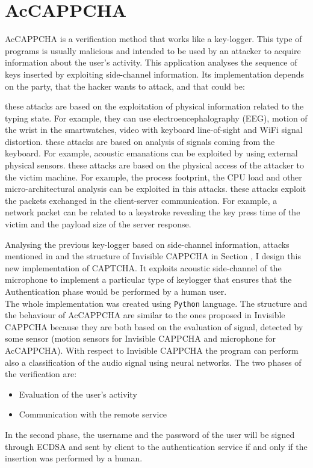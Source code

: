 \chapter{AcCAPPCHA}\label{chapter:AcCAPPCHA}
AcCAPPCHA is a verification method that works like a key-logger. This type of programs is usually malicious and intended to be used by an attacker to acquire information about the user's activity. This application analyses the sequence of keys inserted by exploiting side-channel information. Its implementation depends on the party, that the hacker wants to attack\cite{keylogging}, and that could be:
\begin{itemize}
{these attacks are based on the exploitation of physical information related to the typing state. For example, they can use electroencephalography (EEG), motion of the wrist in the smartwatches, video with keyboard line-of-sight and WiFi signal distortion.}
{these attacks are based on analysis of signals coming from the keyboard. For example, acoustic emanations can be exploited by using external physical sensors.}
{these attacks are based on the physical access of the attacker to the victim machine. For example, the process footprint, the CPU load and other micro-architectural analysis can be exploited in this attacks.}
{these attacks exploit the packets exchanged in the client-server communication. For example, a network packet can be related to a keystroke revealing the key press time of the victim and the payload size of the server response.}
\end{itemize}
Analysing the previous key-logger based on side-channel information, attacks mentioned in  and the structure of Invisible CAPPCHA in Section , I design this new implementation of CAPTCHA. It exploits acoustic side-channel of the microphone to implement a particular type of keylogger that ensures that the Authentication phase would be performed by a human user.\\
The whole implementation was created using \texttt{Python} language. The structure and the behaviour of AcCAPPCHA are similar to the ones proposed in Invisible CAPPCHA because they are both based on the evaluation of signal, detected by some sensor (motion sensors for Invisible CAPPCHA and microphone for AcCAPPCHA). With respect to Invisible CAPPCHA the program can perform also a classification of the audio signal using neural networks. The two phases of the verification are:
\begin{itemize}
\item{Evaluation of the user's activity}
\item{Communication with the remote service}
\end{itemize}
In the second phase, the username and the password of the user will be signed through ECDSA and sent by client to the authentication service if and only if the insertion was performed by a human.

